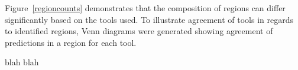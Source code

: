 Figure~\ref{regioncounts} demonstrates that the composition of regions
can differ significantly based on the tools used. To illustrate
agreement of tools in regards to identified regions, Venn diagrams
were generated showing agreement of predictions in a region for each tool.

\begin{figure}
  \centering
  
\end{figure}

blah blah
